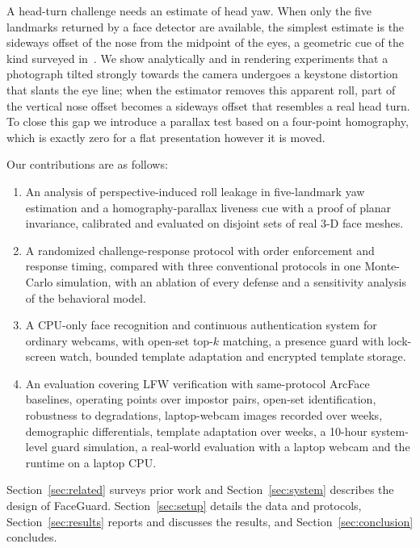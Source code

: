 \documentclass[journal]{IEEEtran}
\newcommand{\sys}{FaceGuard}
\begin{document}
A head-turn challenge needs an estimate of head yaw. When only the five landmarks returned by a face detector are available, the simplest estimate is the sideways offset of the nose from the midpoint of the eyes, a geometric cue of the kind surveyed in~\cite{murphy2009headpose}. We show analytically and in rendering experiments that a photograph tilted strongly towards the camera undergoes a keystone distortion that slants the eye line; when the estimator removes this apparent roll, part of the vertical nose offset becomes a sideways offset that resembles a real head turn. To close this gap we introduce a parallax test based on a four-point homography, which is exactly zero for a flat presentation however it is moved.

Our contributions are as follows:
\begin{enumerate}
\item An analysis of perspective-induced roll leakage in five-landmark yaw estimation and a homography-parallax liveness cue with a proof of planar invariance, calibrated and evaluated on disjoint sets of real 3-D face meshes.
\item A randomized challenge-response protocol with order enforcement and response timing, compared with three conventional protocols in one Monte-Carlo simulation, with an ablation of every defense and a sensitivity analysis of the behavioral model.
\item A CPU-only face recognition and continuous authentication system for ordinary webcams, with open-set top-$k$ matching, a presence guard with lock-screen watch, bounded template adaptation and encrypted template storage.
\item An evaluation covering LFW verification with same-protocol ArcFace baselines, operating points over \opImpostor{} impostor pairs, open-set identification, robustness to degradations, laptop-webcam images recorded over weeks, demographic differentials, template adaptation over weeks, a 10-hour system-level guard simulation, a real-world evaluation with a laptop webcam and the runtime on a laptop CPU.
\end{enumerate}
Section~\ref{sec:related} surveys prior work and Section~\ref{sec:system} describes the design of \sys{}. Section~\ref{sec:setup} details the data and protocols, Section~\ref{sec:results} reports and discusses the results, and Section~\ref{sec:conclusion} concludes.

\end{document}
